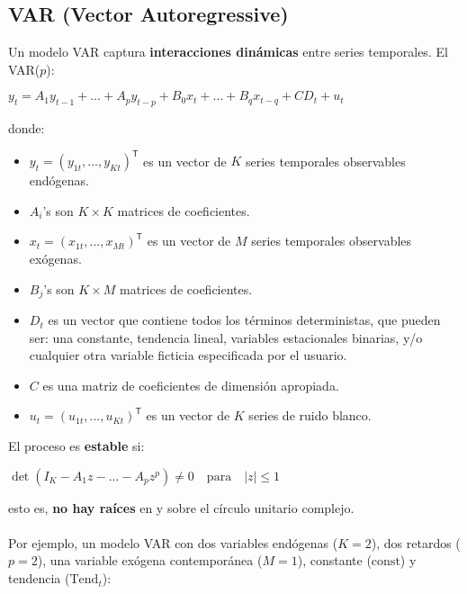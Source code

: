\documentclass[10pt, a4paper, landscape]{extarticle}
\newcommand{\tr}{\mathsf{T}}
\begin{document}
\begin{multicols}{2} %
\section*{VAR (Vector Autoregressive)}
	Un modelo VAR captura \textbf{interacciones dinámicas} entre series temporales. El VAR($p$):
	\begin{center}
		$y_t = A_1 y_{t-1} + \hdots + A_p y_{t-p} + B_0 x_t + \hdots + B_q x_{t-q} + CD_t + u_t$
	\end{center}
	donde:
	\begin{itemize}[leftmargin=*]
		\item $y_t = (y_{1t}, ..., y_{Kt})^\tr$ es un vector de $K$ series temporales observables endógenas.
		\item $A_i$'s son $K \times K$ matrices de coeficientes.
		\item $x_t = (x_{1t}, ..., x_{Mt})^\tr$ es un vector de $M$ series temporales observables exógenas.
		\item $B_j$'s son $K \times M$ matrices de coeficientes.
		\item $D_t$ es un vector que contiene todos los términos deterministas, que pueden ser: una constante, tendencia lineal, variables estacionales binarias, y/o cualquier otra variable ficticia especificada por el usuario.
		\item $C$ es una matriz de coeficientes de dimensión apropiada.
		\item $u_t = (u_{1t}, ..., u_{Kt})^\tr$ es un vector de $K$ series de ruido blanco.
	\end{itemize}
	El proceso es \textbf{estable} si:
	\begin{center}
		$\det(I_K - A_1 z - ... - A_p z^p) \neq 0 \quad \mathrm{para} \quad |z| \leq 1$
	\end{center}
	\quad esto es, \textbf{no hay raíces} en y sobre el círculo unitario complejo. \\ \\
	Por ejemplo, un modelo VAR con dos variables endógenas ($K=2$), dos retardos ($p=2$), una variable exógena contemporánea ($M=1$), constante ($\mathrm{const}$) y tendencia ($\mathrm{Tend}_t$):
	\begin{center}
\end{center}
\end{multicols}
\end{document}
